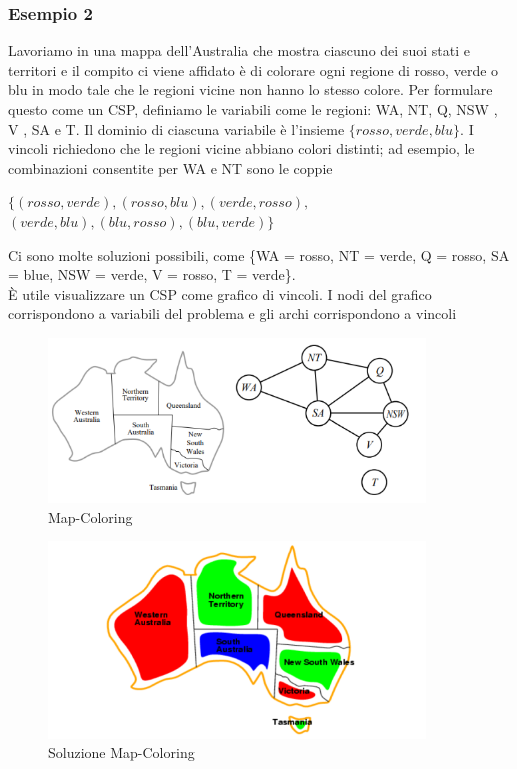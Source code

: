 \subsubsection{Esempio 2}
Lavoriamo in una mappa dell'Australia che mostra ciascuno dei suoi stati e
territori e il compito ci viene affidato è di colorare ogni regione di rosso,
verde o blu in modo tale che le regioni vicine non hanno lo stesso colore. Per
formulare questo come un CSP, definiamo le variabili come le regioni: WA, NT, Q,
NSW , V , SA e T. Il dominio di ciascuna variabile è l'insieme $\{rosso, verde,
    blu\}$. I vincoli richiedono che le regioni vicine abbiano colori distinti; ad
esempio, le combinazioni consentite per WA e NT sono le coppie
\begin{center}
    $\{(rosso, verde), (rosso, blu), (verde, rosso),$\\
    $(verde, blu), (blu, rosso),(blu, verde)\}$
\end{center}
Ci sono molte soluzioni possibili, come \{WA = rosso, NT = verde, Q = rosso, SA
= blue, NSW = verde, V = rosso, T = verde\}.\\
È utile visualizzare un CSP come grafico di
vincoli. I nodi del grafico corrispondono a variabili del problema e gli archi
corrispondono a vincoli

\begin{figure}[H]
    \centering
    \includegraphics[width=10cm, keepaspectratio]{img/Cap1/map-coloring1.png}
    \caption{Map-Coloring}
\end{figure}
\begin{figure}[H]
    \centering
    \includegraphics[width=10cm, keepaspectratio]{img/Cap1/map-coloring2.png}
    \caption{Soluzione Map-Coloring}
\end{figure}

